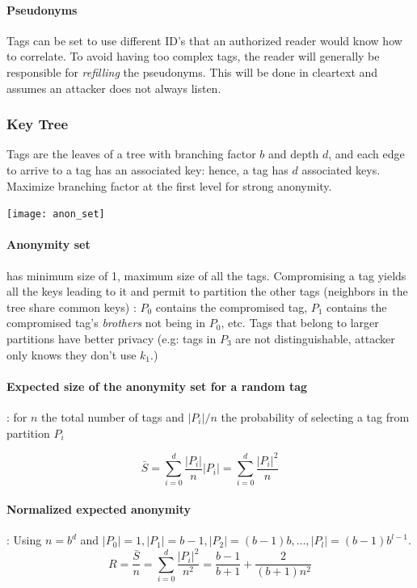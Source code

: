 \documentclass[6pt]{scrartcl}
\begin{document}
\begin{multicols}{4}
\paragraph{Pseudonyms} Tags can be set to use different ID's that an authorized reader would know how to correlate. To avoid having too complex tags, the reader will generally be responsible for \emph{refilling} the pseudonyms. This will be done in cleartext and assumes an attacker does not always listen.

\subsubsection{Key Tree}
Tags are the leaves of a tree with branching factor $b$ and depth $d$, and each edge to arrive to a tag has an associated key: hence, a tag has $d$ associated keys. Maximize branching factor at the first level for strong anonymity.
\begin{center}
\texttt{[image: anon\_set]}
\end{center}

\paragraph{Anonymity set} has minimum size of 1, maximum size of all the tags. Compromising a tag yields all the keys leading to it and permit to partition the other tags (neighbors in the tree share common keys) : $P_0$ contains the compromised tag, $P_1$ contains the compromised tag's \emph{brothers} not being in $P_0$, etc. Tags that belong to larger partitions have better privacy (e.g: tags in $P_3$ are not distinguishable, attacker only knows they don't use $k_1$.)

\paragraph{Expected size of the anonymity set for a random tag}: for $n$ the total number of tags and $|P_i|/n$ the probability of selecting a tag from partition $P_i$

\begin{equation*}
\bar S = \sum_{i=0}^d \frac {|P_i|}n|P_i| =  \sum_{i=0}^d \frac {|P_i|^2}n
\end{equation*}

\paragraph{Normalized expected anonymity} : 
Using $n = b^d$ and $|P_0| = 1, |P_1| = b-1, |P_2| = (b-1)b, \ldots, |P_l| = (b-1)b^{l-1}$.
\begin{equation*}
	R = \frac{\bar{S}}n = \sum_{i=0}^d \frac {|P_i|^2}{n^2} = \frac{b-1}{b+1} + \frac2{(b+1)n^2}
\end{equation*}


\end{multicols}
\end{document}
